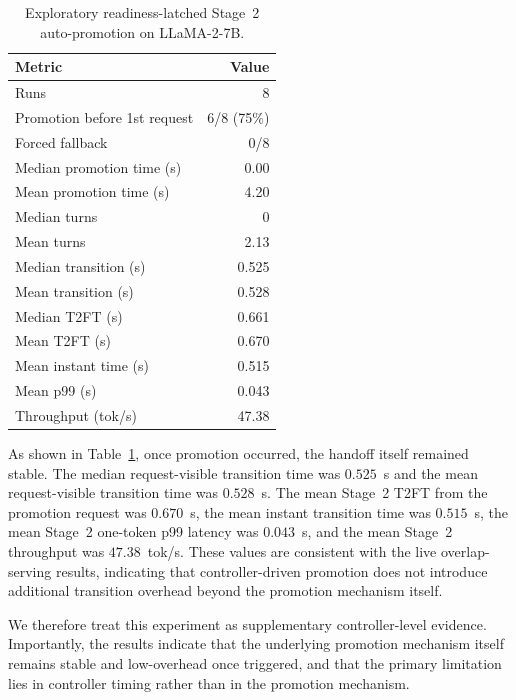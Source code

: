 \documentclass[sigplan,anonymous,review,nonacm]{acmart}
\begin{document}
\begin{table}[t]
\centering
\small
\setlength{\tabcolsep}{3pt}
\renewcommand{\arraystretch}{0.95}
\caption{Exploratory readiness-latched Stage~2 auto-promotion on LLaMA-2-7B.}
\label{tab:auto-promotion-favorable}
\begin{tabular*}{\columnwidth}{@{\extracolsep{\fill}}lr}
\toprule
Metric & Value \\
\midrule
Runs & 8 \\
Promotion before 1st request & 6/8 (75\%) \\
Forced fallback & 0/8 \\
Median promotion time (s) & 0.00 \\
Mean promotion time (s) & 4.20 \\
Median turns & 0 \\
Mean turns & 2.13 \\
Median transition (s) & 0.525 \\
Mean transition (s) & 0.528 \\
Median T2FT (s) & 0.661 \\
Mean T2FT (s) & 0.670 \\
Mean instant time (s) & 0.515 \\
Mean p99 (s) & 0.043 \\
Throughput (tok/s) & 47.38 \\
\bottomrule
\end{tabular*}


\end{table}

As shown in Table~\ref{tab:auto-promotion-favorable}, once promotion occurred, the handoff itself remained stable.
The median request-visible transition time was \(0.525\)~s and the mean request-visible transition time was \(0.528\)~s.
The mean Stage~2 T2FT from the promotion request was \(0.670\)~s, the mean instant transition time was \(0.515\)~s, the mean Stage~2 one-token p99 latency was \(0.043\)~s, and the mean Stage~2 throughput was \(47.38\)~tok/s.
These values are consistent with the live overlap-serving results, indicating that controller-driven promotion does not introduce additional transition overhead beyond the promotion mechanism itself.

We therefore treat this experiment as supplementary controller-level evidence.
Importantly, the results indicate that the underlying promotion mechanism itself remains stable and low-overhead once triggered,
and that the primary limitation lies in controller timing rather than in the promotion mechanism.

\FloatBarrier



\end{document}
